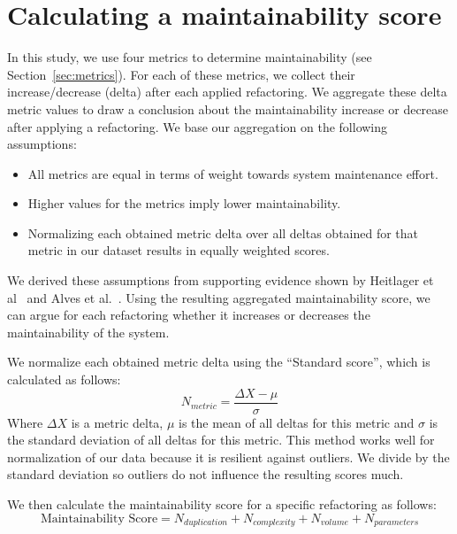 \section{Calculating a maintainability score}\label{sec:metricformula}
In this study, we use four metrics to determine maintainability (see Section~\ref{sec:metrics}). For each of these metrics, we collect their increase/decrease (delta) after each applied refactoring. We aggregate these delta metric values to draw a conclusion about the maintainability increase or decrease after applying a refactoring. We base our aggregation on the following assumptions:
\begin{itemize}
  \item All metrics are equal in terms of weight towards system maintenance effort.
  \item Higher values for the metrics imply lower maintainability.
  \item Normalizing each obtained metric delta over all deltas obtained for that metric in our dataset results in equally weighted scores.
\end{itemize}
We derived these assumptions from supporting evidence shown by Heitlager et al~\cite{heitlager2007practical} and Alves et al.~\cite{alves2010deriving}. Using the resulting aggregated maintainability score, we can argue for each refactoring whether it increases or decreases the maintainability of the system.

We normalize each obtained metric delta using the ``Standard score'', which is calculated as follows:
\begin{equation}\label{eq:scoredev}
N_{metric} = \frac {\Delta X-\mu}{\sigma}
\end{equation}
Where $\Delta X$ is a metric delta, $\mu$ is the mean of all deltas for this metric and $\sigma$ is the standard deviation of all deltas for this metric. This method works well for normalization of our data because it is resilient against outliers. We divide by the standard deviation so outliers do not influence the resulting scores much.

We then calculate the maintainability score for a specific refactoring as follows:
\begin{equation}\label{eq:scoreref}
\text{Maintainability Score} = N_{duplication} + N_{complexity} + N_{volume} + N_{parameters}
\end{equation}
